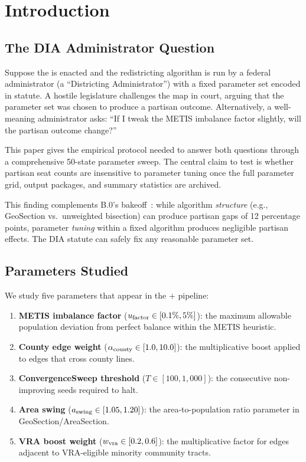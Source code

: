 \section{Introduction}
\label{sec:introduction}

\subsection{The DIA Administrator Question}

Suppose the \dia{} is enacted and the redistricting algorithm is run by
a federal administrator (a ``Districting Administrator'') with a fixed
parameter set encoded in statute.
A hostile legislature challenges the map in court, arguing that the
parameter set was chosen to produce a partisan outcome.
Alternatively, a well-meaning administrator asks: ``If I tweak the
METIS imbalance factor slightly, will the partisan outcome change?''

This paper gives the empirical protocol needed to answer both questions through
a comprehensive 50-state parameter sweep.
The central claim to test is whether partisan seat counts are insensitive to
parameter tuning once the full parameter grid, output packages, and summary
statistics are archived.

This finding complements B.0's bakeoff~\citep{b0paper}: while algorithm
\emph{structure} (e.g., GeoSection vs.\ unweighted bisection) can produce
partisan gaps of 12 percentage points, parameter \emph{tuning} within a
fixed algorithm produces negligible partisan effects.
The DIA statute can safely fix any reasonable parameter set.

\subsection{Parameters Studied}

We study five parameters that appear in the \ar{} + \cs{} pipeline:

\begin{enumerate}
\item \textbf{METIS imbalance factor} ($u_{\mathrm{factor}} \in [0.1\%, 5\%]$):
      the maximum allowable population deviation from perfect balance
      within the METIS heuristic.
\item \textbf{County edge weight} ($\alpha_{\mathrm{county}} \in [1.0, 10.0]$):
      the multiplicative boost applied to edges that cross county lines.
\item \textbf{ConvergenceSweep threshold} ($T \in [100, 1{,}000]$):
      the consecutive non-improving seeds required to halt.
\item \textbf{Area swing} ($a_{\mathrm{swing}} \in [1.05, 1.20]$):
      the area-to-population ratio parameter in GeoSection/AreaSection.
\item \textbf{VRA boost weight} ($w_{\mathrm{vra}} \in [0.2, 0.6]$):
      the multiplicative factor for edges adjacent to VRA-eligible
      minority community tracts.
\end{enumerate}

